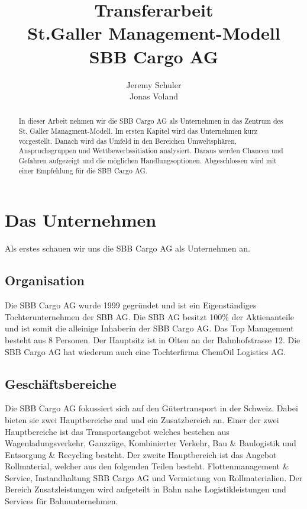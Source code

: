 \documentclass{article}
\title{
    Transferarbeit
    \\St.Galler Management-Modell
    \\SBB Cargo AG}
\author{
    Jeremy Schuler\\
    Jonas Voland
}
\begin{document}
\begin{titlepage}
    \maketitle
\end{titlepage}

\setcounter{page}{2}

\begin{abstract}
In dieser Arbeit nehmen wir die SBB Cargo AG als Unternehmen in das Zentrum des St. Galler Managment-Modell.
Im ersten Kapitel wird das Unternehmen kurz vorgestellt.
Danach wird das Umfeld in den Bereichen Umweltsphären, Anspruchsgruppen und Wettbewerbssitiation analysiert.
Daraus werden Chancen und Gefahren aufgezeigt und die möglichen Handlungsoptionen.
Abgeschlossen wird mit einer Empfehlung für die SBB Cargo AG.
\end{abstract}

\tableofcontents

\newpage

\section{Das Unternehmen}

Als erstes schauen wir uns die SBB Cargo AG als Unternehmen an.

\subsection{Organisation}

Die SBB Cargo AG wurde 1999 gegründet und ist ein Eigenständiges Tochterunternehmen der SBB AG.
Die SBB AG besitzt 100\% der Aktienanteile und ist somit die alleinige Inhaberin der SBB Cargo AG.
Das Top Management besteht aus 8 Personen.
Der Hauptsitz ist in Olten an der Bahnhofstrasse 12.
Die SBB Cargo AG hat wiederum auch eine Tochterfirma ChemOil Logistics AG. \cite{test}

\subsection{Geschäftsbereiche}

Die SBB Cargo AG fokussiert sich auf den Gütertransport in der Schweiz.
Dabei bieten sie zwei Hauptbereiche and und ein Zusatzbereich an.
Einer der zwei Hauptbereiche ist das Transportangebot welches bestehen aus Wagenladungsverkehr, Ganzzüge, Kombinierter Verkehr, Bau \& Baulogistik und Entsorgung \& Recycling besteht.
Der zweite Hauptbereich ist das Angebot Rollmaterial, welcher aus den folgenden Teilen besteht. Flottenmanagement \& Service, Instandhaltung SBB Cargo AG und Vermietung von Rollmaterialien. 
Der Bereich Zusatzleistungen wird aufgeteilt in Bahn nahe Logistikleistungen und Services für Bahnunternehmen. 
\end{document}
